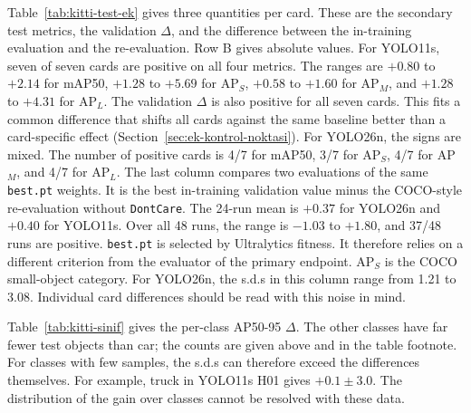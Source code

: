 

Table~\ref{tab:kitti-test-ek} gives three quantities per card. These are the secondary test metrics, the validation $\Delta$, and the difference between the in-training evaluation and the re-evaluation. Row B gives absolute values. For YOLO11s, seven of seven cards are positive on all four metrics. The ranges are $+0.80$ to $+2.14$ for mAP50, $+1.28$ to $+5.69$ for AP$_S$, $+0.58$ to $+1.60$ for AP$_M$, and $+1.28$ to $+4.31$ for AP$_L$. The validation $\Delta$ is also positive for all seven cards. This fits a common difference that shifts all cards against the same baseline better than a card-specific effect (Section~\ref{sec:ek-kontrol-noktasi}). For YOLO26n, the signs are mixed. The number of positive cards is 4/7 for mAP50, 3/7 for AP$_S$, 4/7 for AP$_M$, and 4/7 for AP$_L$. The last column compares two evaluations of the same \texttt{best.pt} weights. It is the best in-training validation value minus the COCO-style re-evaluation without \texttt{DontCare}. The 24-run mean is $+0.37$ for YOLO26n and $+0.40$ for YOLO11s. Over all 48 runs, the range is $-1.03$ to $+1.80$, and 37/48 runs are positive. \texttt{best.pt} is selected by Ultralytics fitness. It therefore relies on a different criterion from the evaluator of the primary endpoint. AP$_S$ is the COCO small-object category. For YOLO26n, the s.d.s in this column range from 1.21 to 3.08. Individual card differences should be read with this noise in mind.



Table~\ref{tab:kitti-sinif} gives the per-class AP50-95 $\Delta$. The other classes have far fewer test objects than car; the counts are given above and in the table footnote. For classes with few samples, the s.d.s can therefore exceed the differences themselves. For example, truck in YOLO11s H01 gives $+0.1\pm3.0$. The distribution of the gain over classes cannot be resolved with these data.

